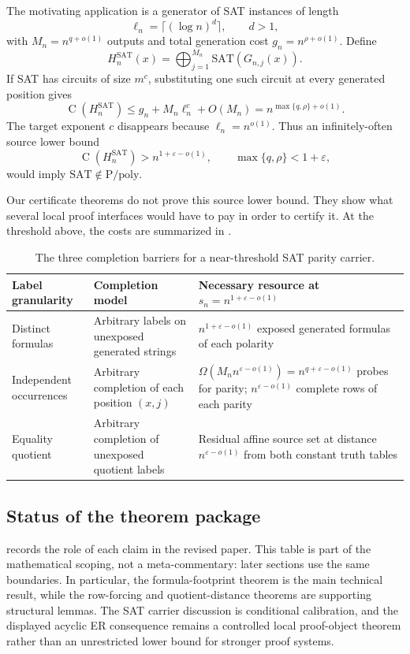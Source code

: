 \documentclass[11pt]{article}
\theoremstyle{definition}
\newcommand{\Ckt}{\operatorname{C}}
\newcommand{\SAT}{\mathrm{SAT}}
\newcommand{\Ppoly}{\mathrm{P/poly}}
\newcommand{\eps}{\varepsilon}
\begin{document}
The motivating application is a generator of SAT instances of length
\[
  \ell_n=\lceil(\log n)^d\rceil,
  \qquad d>1,
\]
with $M_n=n^{q+o(1)}$ outputs and total generation cost $g_n=n^{\rho+o(1)}$.  Define
\[
  H_n^{\SAT}(x)
  =\bigoplus_{j=1}^{M_n}\SAT(G_{n,j}(x)).
\]
If SAT has circuits of size $m^c$, substituting one such circuit at every generated position gives
\[
  \Ckt(H_n^{\SAT})
  \le g_n+M_n\ell_n^c+O(M_n)
  =n^{\max\{q,\rho\}+o(1)}.
\]
The target exponent $c$ disappears because $\ell_n=n^{o(1)}$.  Thus an infinitely-often source lower bound
\[
  \Ckt(H_n^{\SAT})>n^{1+\eps-o(1)},
  \qquad \max\{q,\rho\}<1+\eps,
\]
would imply $\SAT\notin\Ppoly$.

Our certificate theorems do not prove this source lower bound.  They show what several local proof interfaces would have to pay in order to certify it.  At the threshold above, the costs are summarized in .

\begin{table}[htbp]
\centering
\small
\begin{tabularx}{\textwidth}{@{}>{\raggedright\arraybackslash}p{}
>{\raggedright\arraybackslash}p{}
>{\raggedright\arraybackslash}X@{}}
\toprule
Label granularity & Completion model & Necessary resource at $s_n=n^{1+\eps-o(1)}$ \\
\midrule
Distinct formulas & Arbitrary labels on unexposed generated strings &
$n^{1+\eps-o(1)}$ exposed generated formulas of each polarity \\
Independent occurrences & Arbitrary completion of each position $(x,j)$ &
$\Omega(M_nn^{\eps-o(1)})=n^{q+\eps-o(1)}$ probes for parity; $n^{\eps-o(1)}$ complete rows of each parity \\
Equality quotient & Arbitrary completion of unexposed quotient labels &
Residual affine source set at distance $n^{\eps-o(1)}$ from both constant truth tables \\
\bottomrule
\end{tabularx}
\caption{The three completion barriers for a near-threshold SAT parity carrier.}
\label{tab:intro-summary}
\end{table}

\subsection{Status of the theorem package}

 records the role of each claim in the revised paper.  This table is part of the mathematical scoping, not a meta-commentary: later sections use the same boundaries.  In particular, the formula-footprint theorem is the main technical result, while the row-forcing and quotient-distance theorems are supporting structural lemmas.  The SAT carrier discussion is conditional calibration, and the displayed acyclic ER consequence remains a controlled local proof-object theorem rather than an unrestricted lower bound for stronger proof systems.
\end{document}
